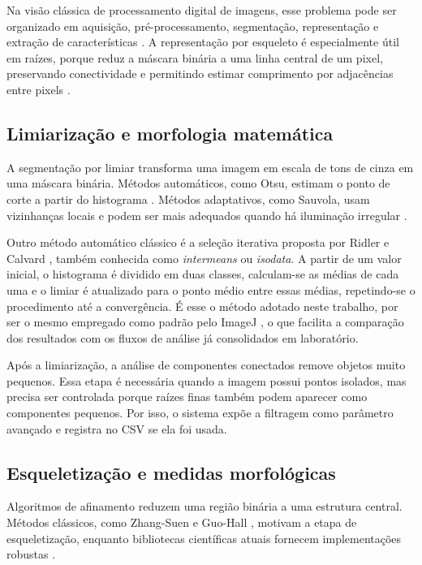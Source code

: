 \documentclass[12pt]{article}
\begin{document}
Na visão clássica de processamento digital de imagens, esse problema pode ser organizado em aquisição, pré-processamento, segmentação, representação e extração de características \cite{gonzalez2008digital}. A representação por esqueleto é especialmente útil em raízes, porque reduz a máscara binária a uma linha central de um pixel, preservando conectividade e permitindo estimar comprimento por adjacências entre pixels \cite{gonzalez2008digital}.

\subsection{Limiarização e morfologia matemática}

A segmentação por limiar transforma uma imagem em escala de tons de cinza em uma máscara binária. Métodos automáticos, como Otsu, estimam o ponto de corte a partir do histograma \cite{otsu1979threshold}. Métodos adaptativos, como Sauvola, usam vizinhanças locais e podem ser mais adequados quando há iluminação irregular \cite{sauvola2000adaptive}.

Outro método automático clássico é a seleção iterativa proposta por Ridler e Calvard \cite{ridler1978picture}, também conhecida como \textit{intermeans} ou \textit{isodata}. A partir de um valor inicial, o histograma é dividido em duas classes, calculam-se as médias de cada uma e o limiar é atualizado para o ponto médio entre essas médias, repetindo-se o procedimento até a convergência. É esse o método adotado neste trabalho, por ser o mesmo empregado como padrão pelo ImageJ \cite{schneider2012imagej}, o que facilita a comparação dos resultados com os fluxos de análise já consolidados em laboratório.

Após a limiarização, a análise de componentes conectados remove objetos muito pequenos. Essa etapa é necessária quando a imagem possui pontos isolados, mas precisa ser controlada porque raízes finas também podem aparecer como componentes pequenos. Por isso, o sistema expõe a filtragem como parâmetro avançado e registra no CSV se ela foi usada.

\subsection{Esqueletização e medidas morfológicas}

Algoritmos de afinamento reduzem uma região binária a uma estrutura central. Métodos clássicos, como Zhang-Suen \cite{zhang1984thinning} e Guo-Hall \cite{guo1989parallel}, motivam a etapa de esqueletização, enquanto bibliotecas científicas atuais fornecem implementações robustas \cite{vanderwalt2014skimage}.
\end{document}
